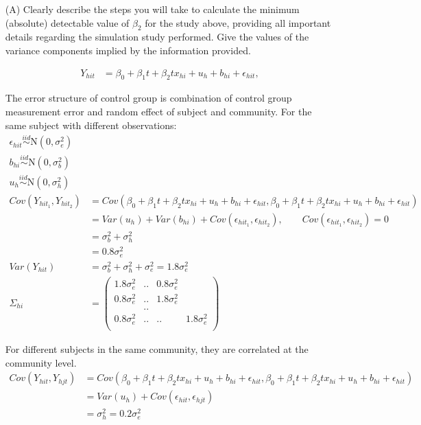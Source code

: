 								\begin{itemize}
								\vspace{0.2cm} 
								\item[(A)] Clearly describe the steps you will take to calculate the minimum (absolute) detectable value of $\beta_2$ for the study above, providing all
								           important details regarding the simulation study performed. Give the values of the variance components implied by the information provided. 	

\begin{align*}
Y_{hit} &= \beta_0 + \beta_1t + \beta_2 t x_{hi} + u_h + b_{hi} + \epsilon_{hit},
\end{align*}

The error structure of control group is combination of control group measurement error and random effect of subject and community. For the same subject with different observations:
\begin{align*}
\epsilon_{hit} \overset{iid}{\sim} \text{N}\left(0,\sigma^2_e\right) \\
b_{hi} \overset{iid}{\sim} \text{N}\left(0,\sigma^2_b\right)\\
u_{h} \overset{iid}{\sim} \text{N}\left(0,\sigma^2_h\right)\\
Cov(Y_{hit_1}, Y_{hit_2}) &=Cov( \beta_0 + \beta_1t + \beta_2 t x_{hi} + u_h + b_{hi} + \epsilon_{hit},  \beta_0 + \beta_1t + \beta_2 t x_{hi} + u_h + b_{hi} + \epsilon_{hit})  \\ 
&=Var(u_h) + Var(b_{hi}) + Cov(\epsilon_{hit_1}, \epsilon_{hit_2}), \qquad Cov(\epsilon_{hit_1}, \epsilon_{hit_2}) = 0 \\
&= \sigma^2_b + \sigma^2_h \\
&= 0.8 \sigma_e^2\\
Var(Y_{hit}) &= \sigma^2_b + \sigma^2_h +  \sigma_e^2 = 1.8 \sigma_e^2\\
\Sigma_{hi} &= \begin{pmatrix}
1.8 \sigma_e^2  &.. & 0.8 \sigma_e^2\\
0.8 \sigma_e^2 &..& 1.8 \sigma_e^2\\
&.. & \\
0.8 \sigma_e^2 & .. &.. & 1.8 \sigma_e^2\\
\end{pmatrix}
\end{align*}

For different subjects in the same community, they are correlated at the community level.
\begin{align*}
Cov(Y_{hit}, Y_{hjt})  &=Cov( \beta_0 + \beta_1t + \beta_2 t x_{hi} + u_h + b_{hi} + \epsilon_{hit},  \beta_0 + \beta_1t + \beta_2 t x_{hi} + u_h + b_{hi} + \epsilon_{hit})  \\ 
&=Var(u_h) + Cov(\epsilon_{hit}, \epsilon_{hjt}) \\
& =  \sigma^2_h = 0.2 \sigma_e^2
\end{align*}


\end{itemize}
